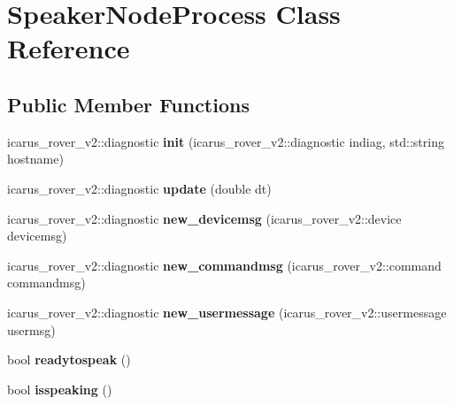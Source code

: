 \hypertarget{classSpeakerNodeProcess}{}\section{Speaker\+Node\+Process Class Reference}
\label{classSpeakerNodeProcess}
\subsection*{Public Member Functions}
\begin{DoxyCompactItemize}
\item 
\mbox{\label{classSpeakerNodeProcess_a350e735c3b3eefd50937ca9e815bbd7a}} 
icarus\+\_\+rover\+\_\+v2\+::diagnostic {\bfseries init} (icarus\+\_\+rover\+\_\+v2\+::diagnostic indiag, std\+::string hostname)
\item 
\mbox{\label{classSpeakerNodeProcess_a60bad9cb4703196ce2e729103f24f2d8}} 
icarus\+\_\+rover\+\_\+v2\+::diagnostic {\bfseries update} (double dt)
\item 
\mbox{\label{classSpeakerNodeProcess_ac11d93dc311d24ee2821a26e621a8007}} 
icarus\+\_\+rover\+\_\+v2\+::diagnostic {\bfseries new\+\_\+devicemsg} (icarus\+\_\+rover\+\_\+v2\+::device devicemsg)
\item 
\mbox{\label{classSpeakerNodeProcess_aa0129d5c025af491098c8b9683f4fff6}} 
icarus\+\_\+rover\+\_\+v2\+::diagnostic {\bfseries new\+\_\+commandmsg} (icarus\+\_\+rover\+\_\+v2\+::command commandmsg)
\item 
\mbox{\label{classSpeakerNodeProcess_a70bf6e48bd782d2e5eb5185c45cc77cb}} 
icarus\+\_\+rover\+\_\+v2\+::diagnostic {\bfseries new\+\_\+usermessage} (icarus\+\_\+rover\+\_\+v2\+::usermessage usermsg)
\item 
\mbox{\label{classSpeakerNodeProcess_a4817e6842df951141a90f39ba3afb408}} 
bool {\bfseries readytospeak} ()
\item 
\mbox{\label{classSpeakerNodeProcess_ab34dd30d01a566f9e656eaf149bf8017}} 
bool {\bfseries isspeaking} ()
\item 

\end{DoxyCompactItemize}
